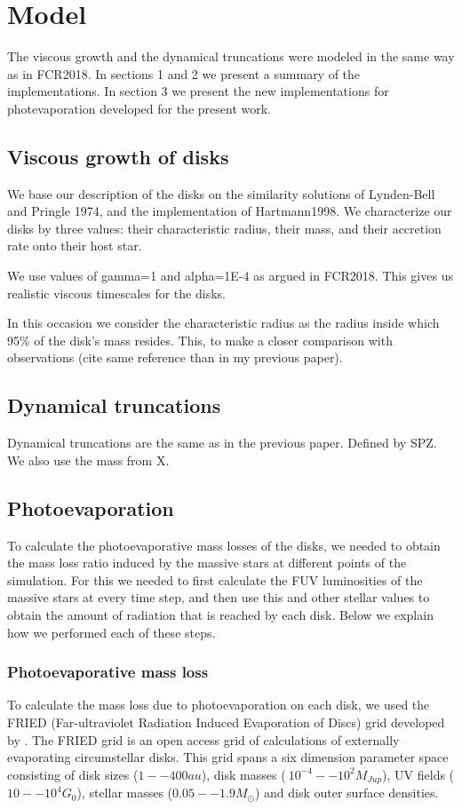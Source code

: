 \documentclass[fleqn,usenatbib]{mnras}
\begin{document}
\section{Model}
\label{sec:model}

The viscous growth and the dynamical truncations were modeled in the same way as in FCR2018. In sections 1 and 2 we present a summary of the implementations. In section 3 we present the new implementations for photevaporation developed for the present work.

\subsection{Viscous growth of disks}

We base our description of the disks on the similarity solutions of Lynden-Bell and Pringle 1974, and the implementation of Hartmann1998. We characterize our disks by three values: their characteristic radius, their mass, and their accretion rate onto their host star.

We use values of gamma=1 and alpha=1E-4 as argued in FCR2018. This gives us realistic viscous timescales for the disks.

In this occasion we consider the characteristic radius as the radius inside which 95\% of the disk's mass resides. This, to make a closer comparison with observations (cite same reference than in my previous paper).

\subsection{Dynamical truncations}
Dynamical truncations are the same as in the previous paper. Defined by SPZ. We also use the mass from X.

\subsection{Photoevaporation}
To calculate the photoevaporative mass losses of the disks, we needed to obtain the mass loss ratio induced by the massive stars at different points of the simulation. For this we needed to first calculate the FUV luminosities of the massive stars at every time step, and then use this and other stellar values to obtain the amount of radiation that is reached by each disk. Below we explain how we performed each of these steps. 

\subsubsection{Photoevaporative mass loss}
To calculate the mass loss due to photoevaporation on each disk, we used the FRIED (Far-ultraviolet Radiation Induced Evaporation of Discs) grid developed by \citet{haworth2018}. The FRIED grid is an open access grid of calculations of externally evaporating circumstellar disks. This grid spans a six dimension parameter space consisting of disk sizes ($1 -- 400 au$), disk masses ($~10^{-4} -- 10^{2} M_{Jup}$), UV fields ($10 -- 10^{4} G_0$), stellar masses ($0.05 -- 1.9 M_{\odot}$) and disk outer surface densities. 
\end{document}
